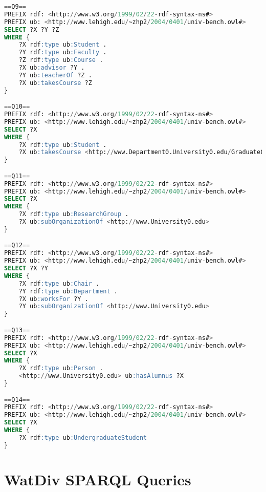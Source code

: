 \begin{lstlisting}[language=SQL, basicstyle=\ttfamily\scriptsize,morekeywords={PREFIX,OPTIONAL,FILTER,java,rdf,rdfs,url},label=lubm-sparql-queries,basewidth=0.5em]
==Q9==
PREFIX rdf: <http://www.w3.org/1999/02/22-rdf-syntax-ns#>
PREFIX ub: <http://www.lehigh.edu/~zhp2/2004/0401/univ-bench.owl#>
SELECT ?X ?Y ?Z
WHERE {
    ?X rdf:type ub:Student .
    ?Y rdf:type ub:Faculty .
    ?Z rdf:type ub:Course .
    ?X ub:advisor ?Y .
    ?Y ub:teacherOf ?Z .
    ?X ub:takesCourse ?Z
}

==Q10==
PREFIX rdf: <http://www.w3.org/1999/02/22-rdf-syntax-ns#>
PREFIX ub: <http://www.lehigh.edu/~zhp2/2004/0401/univ-bench.owl#>
SELECT ?X
WHERE {
    ?X rdf:type ub:Student .
    ?X ub:takesCourse <http://www.Department0.University0.edu/GraduateCourse0>
}

==Q11==
PREFIX rdf: <http://www.w3.org/1999/02/22-rdf-syntax-ns#>
PREFIX ub: <http://www.lehigh.edu/~zhp2/2004/0401/univ-bench.owl#>
SELECT ?X
WHERE {
    ?X rdf:type ub:ResearchGroup .
    ?X ub:subOrganizationOf <http://www.University0.edu>
}

==Q12==
PREFIX rdf: <http://www.w3.org/1999/02/22-rdf-syntax-ns#>
PREFIX ub: <http://www.lehigh.edu/~zhp2/2004/0401/univ-bench.owl#>
SELECT ?X ?Y
WHERE {
    ?X rdf:type ub:Chair .
    ?Y rdf:type ub:Department .
    ?X ub:worksFor ?Y .
    ?Y ub:subOrganizationOf <http://www.University0.edu>
}

==Q13==
PREFIX rdf: <http://www.w3.org/1999/02/22-rdf-syntax-ns#>
PREFIX ub: <http://www.lehigh.edu/~zhp2/2004/0401/univ-bench.owl#>
SELECT ?X
WHERE {
    ?X rdf:type ub:Person .
    <http://www.University0.edu> ub:hasAlumnus ?X
}

==Q14==
PREFIX rdf: <http://www.w3.org/1999/02/22-rdf-syntax-ns#>
PREFIX ub: <http://www.lehigh.edu/~zhp2/2004/0401/univ-bench.owl#>
SELECT ?X
WHERE {
    ?X rdf:type ub:UndergraduateStudent
}
\end{lstlisting}



\section{WatDiv SPARQL Queries}

